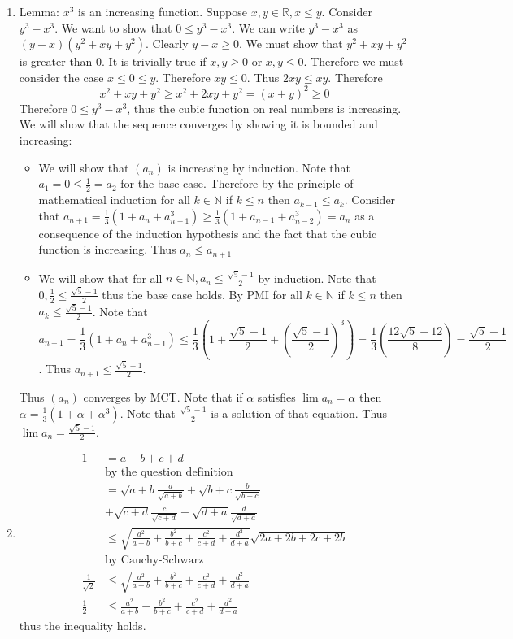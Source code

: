 \documentclass[12pt, letterpaper]{article}
\newcommand{\N}{\mathbb{N}}
\newcommand{\R}{\mathbb{R}}
\begin{document}
\begin{enumerate}
	\item Lemma: $x^3$ is an increasing function.  Suppose $x,y \in \R, x \leq y$.  Consider $y^3 - x^3$.  We want to show that $0 \leq y^3 - x^3$.  We can write $y^3 - x^3$ as $(y-x)(y^2 + xy + y^2)$.  Clearly $y - x \geq 0$.  We must show that $y^2 + xy + y^2$ is greater than 0.  It is trivially true if $x, y \geq 0$ or $x,y \leq 0$.  Therefore 
	we must consider the case $x \leq 0 \leq y$.  Therefore $xy \leq 0$.  Thus $2xy \leq xy$.  Therefore 
	$$
		x^2 + xy + y^2 \geq x^2 + 2xy + y^2 = (x+y)^2 \geq 0	
	$$
	Therefore $0 \leq y^3 - x^3$, thus the cubic function on real numbers is increasing.  
	\newline
	We will show that the sequence converges by showing it is bounded and increasing:
	\begin{itemize}
		\item We will show that $(a_n)$ is increasing by induction.  Note that $a_1 = 0 \leq \frac{1}{2} = a_2$ for the base case.  Therefore by the principle of mathematical induction for all $k \in \N$ if $k \leq n$ then $a_{k-1}\leq a_k$.
		Consider that $a_{n+1} = \frac{1}{3}(1 + a_n + a_{n-1}^3) \geq \frac{1}{3}(1 + a_{n-1} + a_{n-2}^3) = a_{n}$ as a 
		consequence of the induction hypothesis and the fact that the cubic function is increasing.  
		Thus $a_n \leq a_{n+1}$ 
		\item We will show that for all $n \in \N, a_n \leq \frac{\sqrt{5}-1}{2}$ by induction.  Note that $0,\frac{1}{2} \leq \frac{\sqrt{5}-1}{2}$ thus 
		the base case holds.  By PMI for all $k \in \N$ if $k \leq n$ then $a_k \leq \frac{\sqrt{5}-1}{2}$.  Note that 
		$$ a_{n+1} = \frac{1}{3}(1+ a_n + a_{n-1}^3) \leq \frac{1}{3}(1 + \frac{\sqrt{5}-1}{2} + (\frac{\sqrt{5}-1}{2})^3) = \frac{1}{3}( \frac{12\sqrt{5}-12}{8}) = \frac{\sqrt{5}-1}{2}$$.  Thus $a_{n+1} \leq \frac{\sqrt{5}-1}{2}$.    
	\end{itemize}
	Thus $(a_n)$ converges by MCT.  Note that if $\alpha$ satisfies $\lim a_n = \alpha$ then $\alpha = \frac{1}{3}(1 + \alpha + \alpha^3)$.  Note that $\frac{\sqrt{5}-1}{2}$ is a solution of that equation.  Thus $\lim a_n = \frac{\sqrt{5}-1}{2}$.
	\item
	\begin{align*}
		1 &= a + b + c + d\\
		& \text{by the question definition}\\
		 &= \sqrt{a+b}\frac{a}{\sqrt{a+b}} + \sqrt{b+c}\frac{b}{\sqrt{b+c}}\\ &+ \sqrt{c+d}\frac{c}{\sqrt{c+d}} + \sqrt{d+a}\frac{d}{\sqrt{d+a}}\\
		&\leq \sqrt{\frac{a^2}{a+b} +\frac{b^2}{b+c} +\frac{c^2}{c+d} +\frac{d^2}{d+a}}\sqrt{2a+2b+2c+2b}\\
		& \text{by Cauchy-Schwarz}\\
		\frac{1}{\sqrt{2}} &\leq \sqrt{\frac{a^2}{a+b} +\frac{b^2}{b+c} +\frac{c^2}{c+d} +\frac{d^2}{d+a}}\\
		\frac{1}{2} &\leq \frac{a^2}{a+b} +\frac{b^2}{b+c} +\frac{c^2}{c+d} +\frac{d^2}{d+a}
	\end{align*}
	thus the inequality holds.
		

\end{enumerate}
\end{document}
